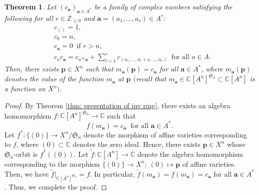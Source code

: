 \documentclass[12pt,a4paper]{amsart}
\newtheorem{thm}{Theorem}[subsection]
\theoremstyle{definition}
\numberwithin{equation}{subsection}
\begin{document}
\begin{thm}\label{thm: sufficient condition for evaluation}
  Let $(c_\mathbf{a})_{\mathbf{a} \in A^*}$ be a family of complex numbers satisfying the following for all $r \in \mathbb{Z}_{\geq 0}$ and $\mathbf{a} = (a_1,\dots,a_r) \in A^r$$:$
  \begin{align*}
    &c_{()} = 1,\\
    &c_0 = n,\\
    &c_\mathbf{a} = 0 \ \text{ if } r > n,\\
    &c_a c_\mathbf{a} = c_{a*\mathbf{a}} + \sum_{l=1}^r c_{(a_1,\dots,a_l+a,\dots,a_r)} \ \text{ for all } a \in A.
  \end{align*}
Then, there exists $\mathbf{p} \in X^n$ such that $m_\mathbf{a}(\mathbf{p}) = c_\mathbf{a}$ for all $\mathbf{a} \in A^*$, where $m_\mathbf{a}(\mathbf{p})$ denotes the value of the function $m_\mathbf{a}$ at $\mathbf{p}$ $($recall that $m_\mathbf{a} \in \mathbb{C}[A^n]^{\mathfrak{S}_n} \subset \mathbb{C}[A^n]$ is a function on $X^n$$)$.
\end{thm}
\begin{proof}
  By Theorem \ref{thm: presentation of inv ring}, there exists an algebra homomorphism $f : \mathbb{C}[A^n]^{\mathfrak{S}_n} \to \mathbb{C}$ such that
  \[
    f(m_\mathbf{a}) = c_\mathbf{a} \ \text{ for all } \mathbf{a} \in A^*.
  \]
  Let $f^* : \{(0)\} \to X^n/\mathfrak{S}_n$ denote the morphism of affine varieties corresponding to $f$, where $(0) \subset \mathbb{C}$ denotes the zero ideal.
  Hence, there exists $\mathbf{p} \in X^n$ whose $\mathfrak{S}_n$-orbit is $f^*((0))$.
  Let $\tilde{f} : \mathbb{C}[A^n] \to \mathbb{C}$ denote the algebra homomorphism corresponding to the morphism $\{(0)\} \to X^n;\ (0) \mapsto \mathbf{p}$ of affine varieties.
  Then, we have $\tilde{f}|_{\mathbb{C}[A^n]^{\mathfrak{S}_n}} = f$.
  In particular, $\tilde{f}(m_\mathbf{a}) = f(m_\mathbf{a}) = c_\mathbf{a}$ for all $\mathbf{a} \in A^*$.
  Thus, we complete the proof.
\end{proof}
\end{document}
